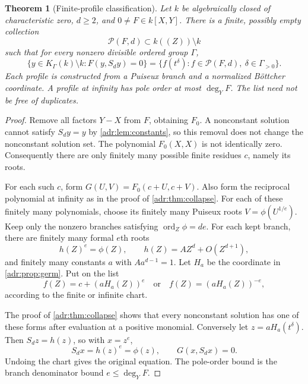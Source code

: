 \documentclass[11pt,letterpaper]{article}
\numberwithin{equation}{section}
\newtheorem{theorem}{Theorem}[section]
\theoremstyle{definition}
\theoremstyle{remark}
\newcommand{\K}{K_\Gamma(k)}
\newcommand{\ord}{\operatorname{ord}}
\begin{document}
\begin{theorem}[Finite-profile classification]\label{adr:thm:profiles}
Let $k$ be algebraically closed of characteristic zero, $d\ge2$, and
$0\ne F\in k[X,Y]$. There is a finite, possibly empty collection
\[
 \mathscr P(F,d)\subset k((Z))\setminus k
\]
such that for every nonzero divisible ordered group $\Gamma$,
\begin{equation}\label{adr:eq:profiles}
 \{y\in\K\setminus k:F(y,S_dy)=0\}
  =\{f(t^\delta):f\in\mathscr P(F,d),\ \delta\in\Gamma_{>0}\}.
\end{equation}
Each profile is constructed from a Puiseux branch and a normalized
B\"ottcher coordinate. A profile at infinity has pole order at most
$\deg_YF$. The list need not be free of duplicates.
\end{theorem}
\begin{proof}
Remove all factors $Y-X$ from $F$, obtaining $F_0$. A nonconstant solution
cannot satisfy $S_dy=y$ by \cref{adr:lem:constants}, so this removal does not
change the nonconstant solution set. The polynomial $F_0(X,X)$ is not
identically zero. Consequently there are only finitely many possible
finite residues $c$, namely its roots.

For each such $c$, form $G(U,V)=F_0(c+U,c+V)$. Also form the reciprocal
polynomial at infinity as in the proof of \cref{adr:thm:collapse}. For each
of these finitely many polynomials, choose its finitely many Puiseux roots
$V=\phi(U^{1/e})$. Keep only the nonzero branches satisfying
$\ord_Z\phi=de$. For each kept branch, there are finitely many formal
$e$th roots
\[
 h(Z)^e=\phi(Z),\qquad h(Z)=A Z^d+O(Z^{d+1}),
\]
and finitely many constants $a$ with $Aa^{d-1}=1$. Let $H_a$ be the
coordinate in \cref{adr:prop:germ}. Put on the list
\begin{equation}\label{adr:eq:profile-shapes}
 f(Z)=c+(aH_a(Z))^e
 \quad\text{or}\quad
 f(Z)=(aH_a(Z))^{-e},
\end{equation}
according to the finite or infinite chart.

The proof of \cref{adr:thm:collapse} shows that every nonconstant solution
has one of these forms after evaluation at a positive monomial.
Conversely let $z=aH_a(t^\delta)$. Then $S_dz=h(z)$, so with $x=z^e$,
\[
 S_dx=h(z)^e=\phi(z),\qquad G(x,S_dx)=0.
\]
Undoing the chart gives the original equation. The pole-order bound is
the branch denominator bound $e\le\deg_YF$.
\end{proof}
\end{document}
